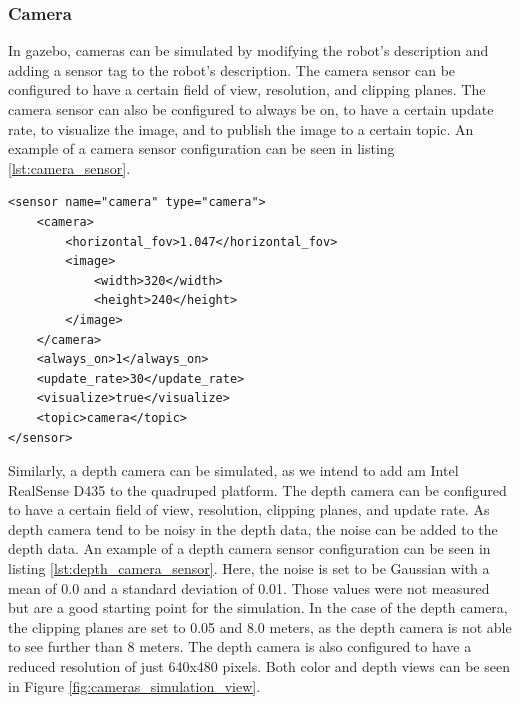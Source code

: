 \documentclass[11pt]{article}
\begin{document}
        \subsubsection{Camera}

        In gazebo, cameras can be simulated by modifying the robot's description and adding a sensor tag to the robot's description. The camera sensor can be configured to have a certain field of view, resolution, and clipping planes. The camera sensor can also be configured to always be on, to have a certain update rate, to visualize the image, and to publish the image to a certain topic. An example of a camera sensor configuration can be seen in listing \ref{lst:camera_sensor}.

\vspace{10pt }
\begin{minipage}{0.9\textwidth}
\begin{lstlisting}[style=xmlStyle, caption={Camera Sensor Configuration}, label={lst:camera_sensor}]
<sensor name="camera" type="camera">
    <camera>
        <horizontal_fov>1.047</horizontal_fov>
        <image>
            <width>320</width>
            <height>240</height>
        </image>
    </camera>
    <always_on>1</always_on>
    <update_rate>30</update_rate>
    <visualize>true</visualize>
    <topic>camera</topic>
</sensor>
\end{lstlisting}
\end{minipage}



        Similarly, a depth camera can be simulated, as we intend to add am Intel RealSense D435 to the quadruped platform. The depth camera can be configured to have a certain field of view, resolution, clipping planes, and update rate. As depth camera tend to be noisy in the depth data, the noise can be added to the depth data. An example of a depth camera sensor configuration can be seen in listing \ref{lst:depth_camera_sensor}. Here, the noise is set to be Gaussian with a mean of 0.0 and a standard deviation of 0.01. Those values were not measured but are a good starting point for the simulation. In the case of the depth camera, the clipping planes are set to 0.05 and 8.0 meters, as the depth camera is not able to see further than 8 meters. The depth camera is also configured to have a reduced resolution of just 640x480 pixels. Both color and depth views can be seen in Figure \ref{fig:cameras_simulation_view}.
        
\end{document}
